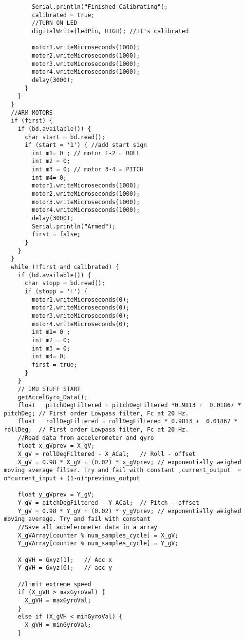 \begin{lstlisting}
        Serial.println("Finished Calibrating");
        calibrated = true;
        //TURN ON LED
        digitalWrite(ledPin, HIGH); //It's calibrated
 
        motor1.writeMicroseconds(1000);
        motor2.writeMicroseconds(1000);
        motor3.writeMicroseconds(1000);
        motor4.writeMicroseconds(1000);
        delay(3000);
      }
    }
  }
  //ARM MOTORS
  if (first) {
    if (bd.available()) {
      char start = bd.read();
      if (start = '1') { //add start sign
        int m1= 0 ; // motor 1-2 = ROLL
        int m2 = 0;
        int m3 = 0; // motor 3-4 = PITCH
        int m4= 0;
        motor1.writeMicroseconds(1000);
        motor2.writeMicroseconds(1000);
        motor3.writeMicroseconds(1000);
        motor4.writeMicroseconds(1000);
        delay(3000);
        Serial.println("Armed");
        first = false;
      }
    }
  }
  while (!first and calibrated) {
    if (bd.available()) {
      char stopp = bd.read();
      if (stopp = '!') {
        motor1.writeMicroseconds(0);
        motor2.writeMicroseconds(0);
        motor3.writeMicroseconds(0);
        motor4.writeMicroseconds(0);
        int m1= 0 ;
        int m2 = 0;
        int m3 = 0;
        int m4= 0;
        first = true;
      }
    }
    // IMU STUFF START
    getAccelGyro_Data();
    float   pitchDegFiltered = pitchDegFiltered *0.9813 +  0.01867 * pitchDeg; // First order Lowpass filter, Fc at 20 Hz.
    float   rollDegFiltered = rollDegFiltered * 0.9813 +  0.01867 * rollDeg;  // First order Lowpass filter, Fc at 20 Hz.
    //Read data from accelerometer and gyro
    float x_gVprev = X_gV;
    X_gV = rollDegFiltered - X_ACal;   // Roll - offset
    X_gV = 0.98 * X_gV + (0.02) * x_gVprev; // exponentially weighed moving average filter. Try and fail with constant ,current_output  = α*current_input + (1-α)*previous_output
 
    float y_gVprev = Y_gV;
    Y_gV = pitchDegFiltered - Y_ACal;  // Pitch - offset
    Y_gV = 0.98 * Y_gV + (0.02) * y_gVprev; // exponentially weighed moving average. Try and fail with constant
    //Save all accelerometer data in a array
    X_gVArray[counter % num_samples_cycle] = X_gV;
    Y_gVArray[counter % num_samples_cycle] = Y_gV;
 
    X_gVH = Gxyz[1];   // Acc x
    Y_gVH = Gxyz[0];   // acc y
 
    //limit extreme speed
    if (X_gVH > maxGyroVal) {
      X_gVH = maxGyroVal;
    }
    else if (X_gVH < minGyroVal) {
      X_gVH = minGyroVal;
    }
 

\end{lstlisting}
